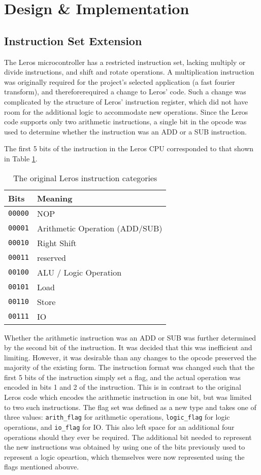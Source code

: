\section{Design \& Implementation}
\subsection{Instruction Set Extension}
The Leros microcontroller has a restricted instruction set, lacking multiply
or divide instructions, and shift and rotate operations. A multiplication
instruction was originally required for the
project's selected application (a fast fourier transform), and thereforerequired a
change to Leros' code. Such a change was complicated by the structure of
Leros' instruction
register, which did not have room for the additional logic to accommodate
new
operations. Since the Leros code supports only two arithmetic instructions,
a single bit in the opcode was used to determine whether the instruction
was an ADD or a SUB instruction.

The first 5 bits of the instruction in the Leros CPU
corresponded to that shown
in Table \ref{tab:original-instruction}.

\begin{table}
\centering
\caption{The original Leros instruction categories}
\label{tab:original-instruction}
\begin{tabular}{|l|l|}
\hline
\textbf{Bits} & Meaning \\
\hline
\texttt{00000} & NOP \\
\texttt{00001} & Arithmetic Operation (ADD/SUB) \\
\texttt{00010} & Right Shift \\
\texttt{00011} & reserved \\
\texttt{00100} & ALU / Logic Operation \\
\texttt{00101} & Load \\
\texttt{00110} & Store \\
\texttt{00111} & IO \\
\hline
\end{tabular}
\end{table}

Whether the arithmetic instruction was an ADD or SUB was further determined by
the second bit of the instruction. It was decided that this was inefficient and
limiting. However, it was desirable than any changes to the opcode preserved the
majority of the existing form. The instruction format was changed such that the
first 5 bits of the instruction simply set a flag, and the actual operation was
encoded in bits 1 and 2 of the instruction. This is in contrast to the original
Leros code which encodes the arithmetic instruction in one bit, but was limited
to two such instructions. The flag set was defined as a new type and takes one
of three values: \texttt{arith\_flag} for arithmetic operations,
\texttt{logic\_flag} for logic operations, and  \texttt{io\_flag} for IO. This
also left space for an additional four operations should they ever be required.
The additional bit needed to represent the new instructions was obtained by using
one of the bits previously used to represent a logic opeartion, which themselves
were now represented using the flags mentioned abouve.

